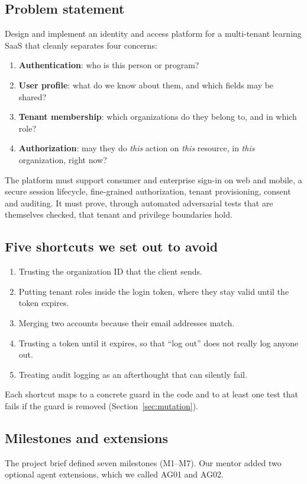\subsection{Problem statement}
Design and implement an identity and access platform for a multi-tenant learning SaaS that cleanly separates four concerns:
\begin{enumerate}
  \item \textbf{Authentication}: who is this person or program?
  \item \textbf{User profile}: what do we know about them, and which fields may be shared?
  \item \textbf{Tenant membership}: which organizations do they belong to, and in which role?
  \item \textbf{Authorization}: may they do \emph{this} action on \emph{this} resource, in \emph{this} organization, right now?
\end{enumerate}
The platform must support consumer and enterprise sign-in on web and mobile, a secure session lifecycle, fine-grained authorization, tenant provisioning, consent and auditing. It must prove, through automated adversarial tests that are themselves checked, that tenant and privilege boundaries hold.

\subsection{Five shortcuts we set out to avoid}
\begin{enumerate}
  \item Trusting the organization ID that the client sends.
  \item Putting tenant roles inside the login token, where they stay valid until the token expires.
  \item Merging two accounts because their email addresses match.
  \item Trusting a token until it expires, so that ``log out'' does not really log anyone out.
  \item Treating audit logging as an afterthought that can silently fail.
\end{enumerate}
Each shortcut maps to a concrete guard in the code and to at least one test that fails if the guard is removed (Section~\ref{sec:mutation}).

\subsection{Milestones and extensions}
The project brief defined seven milestones (M1--M7). Our mentor added two optional agent extensions, which we called AG01 and AG02.


